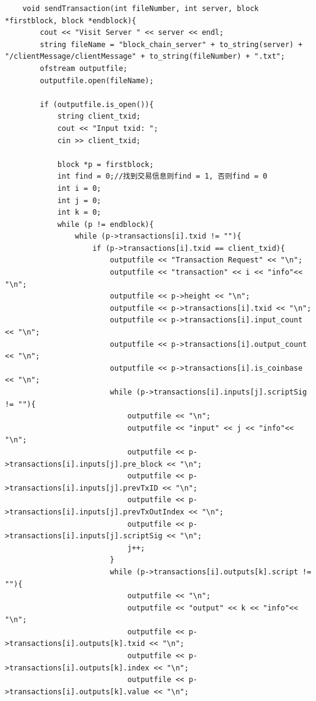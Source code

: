 \documentclass[10pt,a4paper]{article}
\begin{document}
    \begin{verbatim}
    void sendTransaction(int fileNumber, int server, block *firstblock, block *endblock){
        cout << "Visit Server " << server << endl;
        string fileName = "block_chain_server" + to_string(server) + "/clientMessage/clientMessage" + to_string(fileNumber) + ".txt";
        ofstream outputfile;
        outputfile.open(fileName);
    
        if (outputfile.is_open()){
            string client_txid;
            cout << "Input txid: ";
            cin >> client_txid;
    
            block *p = firstblock;
            int find = 0;//找到交易信息则find = 1, 否则find = 0
            int i = 0;
            int j = 0;
            int k = 0;
            while (p != endblock){
                while (p->transactions[i].txid != ""){
                    if (p->transactions[i].txid == client_txid){
                        outputfile << "Transaction Request" << "\n";
                        outputfile << "transaction" << i << "info"<< "\n";
                        outputfile << p->height << "\n";
                        outputfile << p->transactions[i].txid << "\n";
                        outputfile << p->transactions[i].input_count << "\n";
                        outputfile << p->transactions[i].output_count << "\n";
                        outputfile << p->transactions[i].is_coinbase << "\n";
                        while (p->transactions[i].inputs[j].scriptSig != ""){
                            outputfile << "\n";
                            outputfile << "input" << j << "info"<< "\n";
                            outputfile << p->transactions[i].inputs[j].pre_block << "\n";
                            outputfile << p->transactions[i].inputs[j].prevTxID << "\n";
                            outputfile << p->transactions[i].inputs[j].prevTxOutIndex << "\n";
                            outputfile << p->transactions[i].inputs[j].scriptSig << "\n";
                            j++;
                        }
                        while (p->transactions[i].outputs[k].script != ""){
                            outputfile << "\n";
                            outputfile << "output" << k << "info"<< "\n";
                            outputfile << p->transactions[i].outputs[k].txid << "\n";
                            outputfile << p->transactions[i].outputs[k].index << "\n";
                            outputfile << p->transactions[i].outputs[k].value << "\n";

\end{verbatim}
\end{document}
